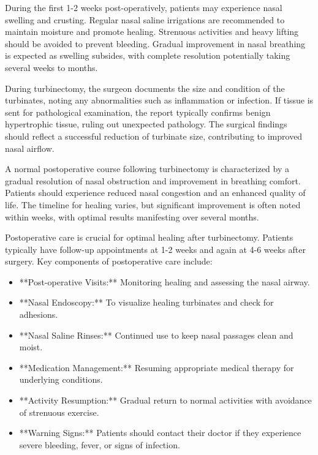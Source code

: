 During the first 1-2 weeks post-operatively, patients may experience nasal swelling and crusting. Regular nasal saline irrigations are recommended to maintain moisture and promote healing. Strenuous activities and heavy lifting should be avoided to prevent bleeding. Gradual improvement in nasal breathing is expected as swelling subsides, with complete resolution potentially taking several weeks to months.

During turbinectomy, the surgeon documents the size and condition of the turbinates, noting any abnormalities such as inflammation or infection. If tissue is sent for pathological examination, the report typically confirms benign hypertrophic tissue, ruling out unexpected pathology. The surgical findings should reflect a successful reduction of turbinate size, contributing to improved nasal airflow.

A normal postoperative course following turbinectomy is characterized by a gradual resolution of nasal obstruction and improvement in breathing comfort. Patients should experience reduced nasal congestion and an enhanced quality of life. The timeline for healing varies, but significant improvement is often noted within weeks, with optimal results manifesting over several months.

Postoperative care is crucial for optimal healing after turbinectomy. Patients typically have follow-up appointments at 1-2 weeks and again at 4-6 weeks after surgery. Key components of postoperative care include:

\begin{itemize}
  \item **Post-operative Visits:** Monitoring healing and assessing the nasal airway.
  \item **Nasal Endoscopy:** To visualize healing turbinates and check for adhesions.
  \item **Nasal Saline Rinses:** Continued use to keep nasal passages clean and moist.
  \item **Medication Management:** Resuming appropriate medical therapy for underlying conditions.
  \item **Activity Resumption:** Gradual return to normal activities with avoidance of strenuous exercise.
  \item **Warning Signs:** Patients should contact their doctor if they experience severe bleeding, fever, or signs of infection.
\end{itemize}

